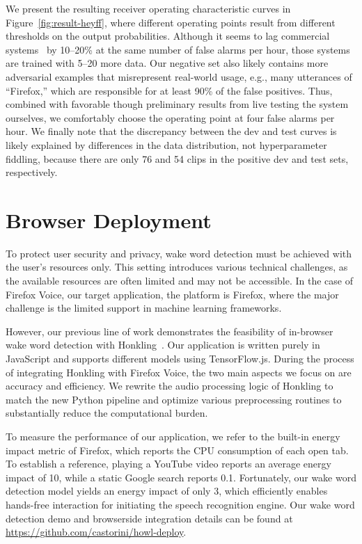 \documentclass[11pt,a4paper]{article}
\begin{document}
We present the resulting receiver operating characteristic curves in Figure~\ref{fig:result-heyff}, where different operating points result from different thresholds on the output probabilities.
Although it seems to lag commercial systems~\cite{sainath2015convolutional} by 10--20\% at the same number of false alarms per hour, those systems are trained with 5--20 more data.
Our negative set also likely contains more adversarial examples that misrepresent real-world usage, e.g., many utterances of ``Firefox,'' which are responsible for at least 90\% of the false positives.
Thus, combined with favorable though preliminary results from live testing the system ourselves, we comfortably choose the operating point at four false alarms per hour.
We finally note that the discrepancy between the dev and test curves is likely explained by differences in the data distribution, not hyperparameter fiddling, because there are only 76 and 54 clips in the positive dev and test sets, respectively.


\section{Browser Deployment}

To protect user security and privacy, wake word detection must be achieved with the user's resources only. 
This setting introduces various technical challenges, as the available resources are often limited and may not be accessible.
In the case of Firefox Voice, our target application, the platform is Firefox, where the major challenge is the limited support in machine learning frameworks. 

However, our previous line of work demonstrates the feasibility of in-browser wake word detection with Honkling~\cite{lee2019honkling}.
Our application is written purely in JavaScript and supports different models using TensorFlow.js.
During the process of integrating Honkling with Firefox Voice, the two main aspects we focus on are accuracy and efficiency.
We rewrite the audio processing logic of Honkling to match the new Python pipeline and optimize various preprocessing routines to substantially reduce the computational burden.

To measure the performance of our application, we refer to the built-in energy impact metric of Firefox, which reports the CPU consumption of each open tab.
To establish a reference, playing a YouTube video reports an average energy impact of 10, while a static Google search reports 0.1.
Fortunately, our wake word detection model yields an energy impact of only 3, which efficiently enables hands-free interaction for initiating the speech recognition engine.
Our wake word detection demo and browserside integration details can be found at \url{https://github.com/castorini/howl-deploy}.
\end{document}
